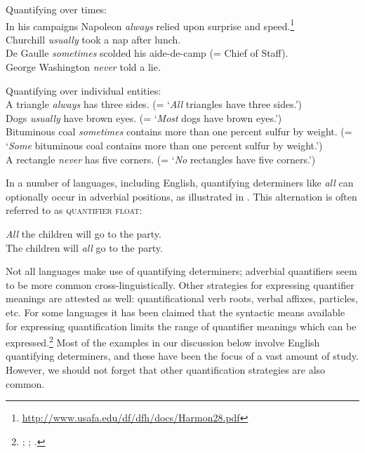 \ea \label{ex:14.7}
Quantifying over times:\\
\ea In his campaigns Napoleon \textit{always} relied upon surprise and speed.\footnote{\url{http://www.usafa.edu/df/dfh/docs/Harmon28.pdf}} \\
\ex Churchill \textit{usually} took a nap after lunch.\\
\ex De Gaulle \textit{sometimes} scolded his aide-de-camp (= Chief of Staff).\\
\ex George Washington \textit{never} told a lie.
                       \z
\z

\ea \label{ex:14.8}
Quantifying over individual entities:\\
\ea A triangle \textit{always} has three sides. (= ‘\textit{All} triangles have three sides.’)\\
\ex Dogs \textit{usually} have brown eyes. (= ‘\textit{Most} dogs have brown eyes.’)\\
\ex Bituminous coal \textit{sometimes} contains more than one percent sulfur by weight. (= ‘\textit{Some} bituminous coal contains more than one percent sulfur by weight.’)\\
\ex A rectangle \textit{never} has five corners. (= ‘\textit{No} rectangles have five corners.’)
                       \z
\z


In a number of languages, including English, quantifying determiners like \textit{all} can optionally occur in adverbial positions, as illustrated in . This alternation is often referred to as \textsc{quantifier float}:

\newpage 

\ea \label{ex:14.9}
\ea \textit{All} the children will go to the party.\\
\ex The children will \textit{all} go to the party.
                       \z
\z


Not all languages make use of quantifying determiners; adverbial quantifiers seem to be more common cross-linguistically. Other strategies for expressing quantifier meanings are attested as well: quantificational verb roots, verbal affixes, particles, etc. For some languages it has been claimed that the syntactic means available for expressing quantification limits the range of quantifier meanings which can be expressed.\footnote{\citet{Baker1995}; \citet{Bittner1995}; \citet{KoenigMichelson2010}.} Most of the examples in our discussion below involve English quantifying determiners, and these have been the focus of a vast amount of study. However, we should not forget that other quantification strategies are also common.


